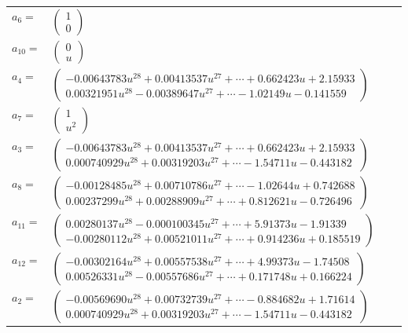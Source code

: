 \documentclass[1p]{elsarticle_modified}
\theoremstyle{definition}
\begin{document}
\begin{tabular}{m{7pt} m{180pt} m{7pt} m{180pt} }
\flushright $a_{6}=$&$\begin{pmatrix}1\\0\end{pmatrix}$ \\
\flushright $a_{10}=$&$\begin{pmatrix}0\\u\end{pmatrix}$ \\
\flushright $a_{4}=$&$\begin{pmatrix}-0.00643783 u^{28}+0.00413537 u^{27}+\cdots+0.662423 u+2.15933\\0.00321951 u^{28}-0.00389647 u^{27}+\cdots-1.02149 u-0.141559\end{pmatrix}$ \\
\flushright $a_{7}=$&$\begin{pmatrix}1\\u^2\end{pmatrix}$ \\
\flushright $a_{3}=$&$\begin{pmatrix}-0.00643783 u^{28}+0.00413537 u^{27}+\cdots+0.662423 u+2.15933\\0.000740929 u^{28}+0.00319203 u^{27}+\cdots-1.54711 u-0.443182\end{pmatrix}$ \\
\flushright $a_{8}=$&$\begin{pmatrix}-0.00128485 u^{28}+0.00710786 u^{27}+\cdots-1.02644 u+0.742688\\0.00237299 u^{28}+0.00288909 u^{27}+\cdots+0.812621 u-0.726496\end{pmatrix}$ \\
\flushright $a_{11}=$&$\begin{pmatrix}0.00280137 u^{28}-0.000100345 u^{27}+\cdots+5.91373 u-1.91339\\-0.00280112 u^{28}+0.00521011 u^{27}+\cdots+0.914236 u+0.185519\end{pmatrix}$ \\
\flushright $a_{12}=$&$\begin{pmatrix}-0.00302164 u^{28}+0.00557538 u^{27}+\cdots+4.99373 u-1.74508\\0.00526331 u^{28}-0.00557686 u^{27}+\cdots+0.171748 u+0.166224\end{pmatrix}$ \\
\flushright $a_{2}=$&$\begin{pmatrix}-0.00569690 u^{28}+0.00732739 u^{27}+\cdots-0.884682 u+1.71614\\0.000740929 u^{28}+0.00319203 u^{27}+\cdots-1.54711 u-0.443182\end{pmatrix}$ \\

\end{tabular}
\end{document}

